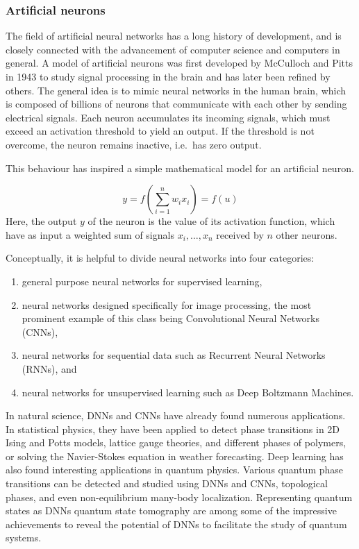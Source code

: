 \documentclass{beamer}
\begin{document}
\begin{frame}
\frametitle{Artificial neurons}

The field of artificial neural networks has a long history of
development, and is closely connected with the advancement of computer
science and computers in general. A model of artificial neurons was
first developed by McCulloch and Pitts in 1943 to study signal
processing in the brain and has later been refined by others. The
general idea is to mimic neural networks in the human brain, which is
composed of billions of neurons that communicate with each other by
sending electrical signals.  Each neuron accumulates its incoming
signals, which must exceed an activation threshold to yield an
output. If the threshold is not overcome, the neuron remains inactive,
i.e.~has zero output.

This behaviour has inspired a simple mathematical model for an artificial neuron.

\begin{equation}
 y = f\left(\sum_{i=1}^n w_ix_i\right) = f(u)
 \label{artificialNeuron}
\end{equation}
Here, the output $y$ of the neuron is the value of its activation function, which have as input
a weighted sum of signals $x_i, \dots ,x_n$ received by $n$ other neurons.

Conceptually, it is helpful to divide neural networks into four
categories:
\begin{enumerate}
\item general purpose neural networks for supervised learning,

\item neural networks designed specifically for image processing, the most prominent example of this class being Convolutional Neural Networks (CNNs),

\item neural networks for sequential data such as Recurrent Neural Networks (RNNs), and

\item neural networks for unsupervised learning such as Deep Boltzmann Machines.
\end{enumerate}

\noindent
In natural science, DNNs and CNNs have already found numerous
applications. In statistical physics, they have been applied to detect
phase transitions in 2D Ising and Potts models, lattice gauge
theories, and different phases of polymers, or solving the
Navier-Stokes equation in weather forecasting.  Deep learning has also
found interesting applications in quantum physics. Various quantum
phase transitions can be detected and studied using DNNs and CNNs,
topological phases, and even non-equilibrium many-body
localization. Representing quantum states as DNNs quantum state
tomography are among some of the impressive achievements to reveal the
potential of DNNs to facilitate the study of quantum systems.


\end{frame}
\end{document}
